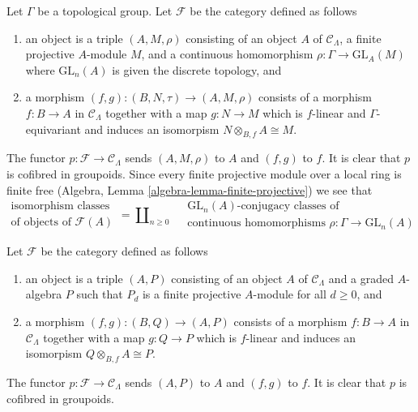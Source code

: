 \begin{example}
\label{example-continuous-representations}
Let $\Gamma$ be a topological group.
Let $\mathcal{F}$ be the category defined as follows
\begin{enumerate}
\item an object is a triple $(A, M, \rho)$ consisting of an
object $A$ of $\mathcal{C}_\Lambda$, a finite projective $A$-module $M$,
and a continuous homomorphism $\rho : \Gamma \to \text{GL}_A(M)$
where $\text{GL}_n(A)$ is given the discrete topology, and
\item a morphism $(f, g) : (B, N, \tau) \to (A, M, \rho)$ consists of
a morphism $f : B \to A$ in $\mathcal{C}_\Lambda$ together
with a map $g : N \to M$ which is $f$-linear and $\Gamma$-equivariant
and induces an isomorpism $N \otimes_{B, f} A \cong M$.
\end{enumerate}
The functor $p : \mathcal{F} \to \mathcal{C}_\Lambda$ sends $(A, M, \rho)$
to $A$ and $(f, g)$ to $f$. It is clear that $p$ is cofibred in groupoids.
Since every finite projective module over a local ring is finite free
(Algebra, Lemma \ref{algebra-lemma-finite-projective})
we see that
$$
\begin{matrix}
\text{isomorphism classes} \\
\text{of objects of }\mathcal{F}(A)
\end{matrix}
=
\coprod\nolimits_{n \geq 0}\quad
\begin{matrix}
\text{GL}_n(A)\text{-conjugacy classes of}\\
\text{continuous homomorphisms }\rho : \Gamma \to \text{GL}_n(A)
\end{matrix}
$$
\end{example}

\begin{example}
\label{example-graded-algebras}
Let $\mathcal{F}$ be the category defined as follows
\begin{enumerate}
\item an object is a triple $(A, P)$ consisting of an
object $A$ of $\mathcal{C}_\Lambda$ and a graded $A$-algebra $P$
such that $P_d$ is a finite projective $A$-module for all $d \geq 0$, and
\item a morphism $(f, g) : (B, Q) \to (A, P)$ consists of
a morphism $f : B \to A$ in $\mathcal{C}_\Lambda$ together
with a map $g : Q \to P$ which is $f$-linear and induces an
isomorpism $Q \otimes_{B, f} A \cong P$.
\end{enumerate}
The functor $p : \mathcal{F} \to \mathcal{C}_\Lambda$ sends $(A, P)$
to $A$ and $(f, g)$ to $f$. It is clear that $p$ is cofibred in groupoids.
\end{example}

